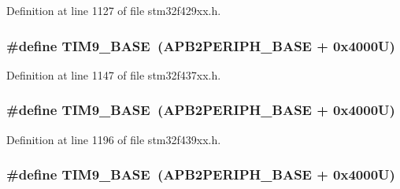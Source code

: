 Definition at line 1127 of file stm32f429xx.\+h.

\subsubsection[{\texorpdfstring{T\+I\+M9\+\_\+\+B\+A\+SE}{TIM9_BASE}}]{\setlength{\rightskip}{0pt plus 5cm}\#define T\+I\+M9\+\_\+\+B\+A\+SE~({\bf A\+P\+B2\+P\+E\+R\+I\+P\+H\+\_\+\+B\+A\+SE} + 0x4000\+U)}\hypertarget{group___peripheral__memory__map_ga92ae902be7902560939223dd765ece08}{}\label{group___peripheral__memory__map_ga92ae902be7902560939223dd765ece08}


Definition at line 1147 of file stm32f437xx.\+h.

\subsubsection[{\texorpdfstring{T\+I\+M9\+\_\+\+B\+A\+SE}{TIM9_BASE}}]{\setlength{\rightskip}{0pt plus 5cm}\#define T\+I\+M9\+\_\+\+B\+A\+SE~({\bf A\+P\+B2\+P\+E\+R\+I\+P\+H\+\_\+\+B\+A\+SE} + 0x4000\+U)}\hypertarget{group___peripheral__memory__map_ga92ae902be7902560939223dd765ece08}{}\label{group___peripheral__memory__map_ga92ae902be7902560939223dd765ece08}


Definition at line 1196 of file stm32f439xx.\+h.

\subsubsection[{\texorpdfstring{T\+I\+M9\+\_\+\+B\+A\+SE}{TIM9_BASE}}]{\setlength{\rightskip}{0pt plus 5cm}\#define T\+I\+M9\+\_\+\+B\+A\+SE~({\bf A\+P\+B2\+P\+E\+R\+I\+P\+H\+\_\+\+B\+A\+SE} + 0x4000\+U)}\hypertarget{group___peripheral__memory__map_ga92ae902be7902560939223dd765ece08}{}\label{group___peripheral__memory__map_ga92ae902be7902560939223dd765ece08}


